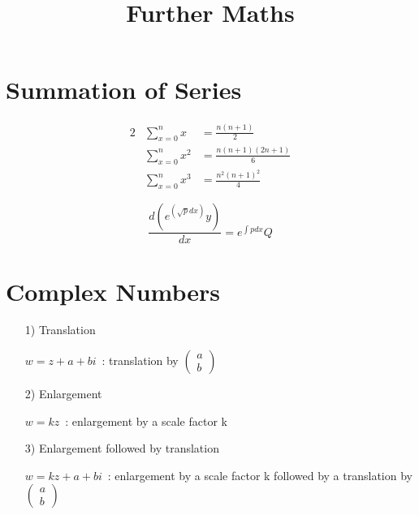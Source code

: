 \documentclass[a4paper,9pt]{scrartcl}
\title{Further Maths}
\begin{document}
    \maketitle
    \tableofcontents

    \parindent


    \section{Summation of Series}\label{sec:summation-of-series}

    \begin{alignat*}{2}
        &\sum_{x=0}^{n}x    &= \frac{n(n+1)}{2} \\
        &\sum_{x=0}^{n}x^2  &= \frac{n(n+1)(2n+1)}{6} \\
        &\sum_{x=0}^{n}x^3  &= \frac{n^2(n+1)^2}{4}
    \end{alignat*}

    \begin{displaymath}
        \frac{d\left(e^\left(\sqrt{p}dx\right)y\right)}{dx} = e^{\int{p}dx} Q
    \end{displaymath}


    \section{Complex Numbers}\label{sec:complex-numbers}

    \parindent

    \begin{itemize}
        \item [1)] Translation

        $w=z+a+bi$\ : translation by
        $\begin{pmatrix}
             a \\b
        \end{pmatrix}$

        \item [2)] Enlargement

        $w=kz$\ : enlargement by a scale factor k

        \item [3)] Enlargement followed by translation

        $w=kz+a+bi$\ : enlargement by a scale factor k followed by a translation by
        $\begin{pmatrix}
             a \\b
        \end{pmatrix}$
    \end{itemize}
\end{document}
